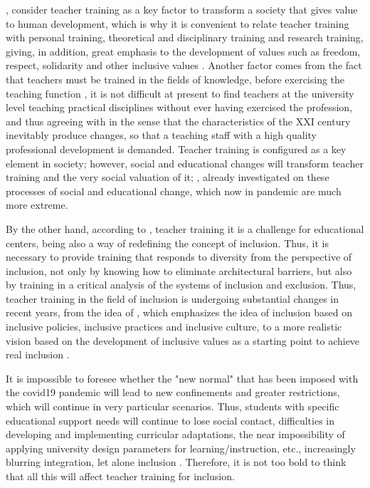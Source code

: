 \documentclass[english]{textolivre}
\begin{document}
\textcite{nieva2016}, %
consider teacher training as a key factor to transform a society that gives value to human development, which is why it is convenient to relate teacher training with personal training, theoretical and disciplinary training and research training, giving, in addition, great emphasis to the development of values such as freedom, respect, solidarity and other inclusive values \cite{diazquero2006}. %
Another factor comes from the fact that teachers must be trained in the fields of knowledge, before exercising the teaching function \cite{aravena2020}, %
it is not difficult at present to find teachers at the university level teaching practical disciplines without ever having exercised the profession, and thus agreeing with \textcite{rodriguez2021} %
in the sense that the characteristics of the XXI century inevitably produce changes, so that a teaching staff with a high quality professional development is demanded. Teacher training is configured as a key element in society; however, social and educational changes will transform teacher training and the very social valuation of it; \textcite{vaillant2015}, %
already investigated on these processes of social and educational change, which now in pandemic are much more extreme.

By the other hand, according to \textcite{infante2011}, %
teacher training it is a challenge for educational centers, being also a way of redefining the concept of inclusion. Thus, it is necessary to provide training that responds to diversity from the perspective of inclusion, not only by knowing how to eliminate architectural barriers, but also by training in a critical analysis of the systems of inclusion and exclusion. Thus, teacher training in the field of inclusion is undergoing substantial changes in recent years, from the idea of \textcite{booth2000}, %
which emphasizes the idea of inclusion based on inclusive policies, inclusive practices and inclusive culture, to a more realistic vision based on the development of inclusive values as a starting point to achieve real inclusion \cite{arnaiz2019}. %

It is impossible to foresee whether the "new normal" that has been imposed with the covid19 pandemic will lead to new confinements and greater restrictions, which will continue in very particular scenarios. Thus, students with specific educational support needs will continue to lose social contact, difficulties in developing and implementing curricular adaptations, the near impossibility of applying university design parameters for learning/instruction, etc., increasingly blurring integration, let alone inclusion \cite{moreno2020}. %
Therefore, it is not too bold to think that all this will affect teacher training for inclusion.
\end{document}
